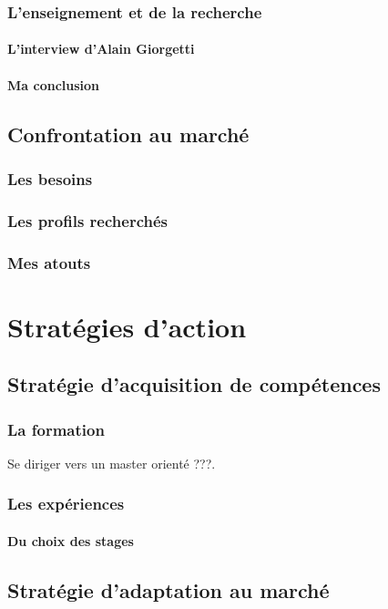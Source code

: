 \documentclass[a4paper,12pt, draft]{report}
\begin{document}
\section{L'enseignement et de la recherche}
\subsection{L'interview d'Alain Giorgetti}

\subsection{Ma conclusion}


\chapter{Confrontation au marché}
\section{Les besoins}
\section{Les profils recherchés}
\section{Mes atouts}

\part{Stratégies d'action}

\chapter{Stratégie d'acquisition de compétences}
\section{La formation}
Se diriger vers un master orienté ???.
\section{Les expériences}
\subsection{Du choix des stages}


\chapter{Stratégie d'adaptation au marché}
\end{document}
